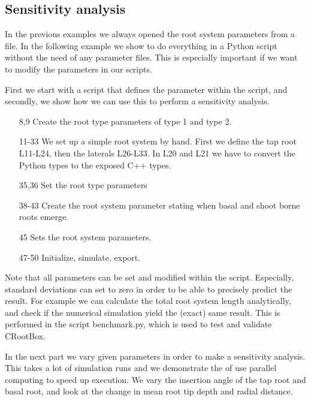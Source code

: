 \documentclass[a4paper]{article}
\begin{document}
\subsection{Sensitivity analysis} \label{sec:sa}

In the previous examples we always opened the root system parameters from a file. 
In the following example we show to do everything in a Python script without the need of any parameter files. 
This is especially important if we want to modify the parameters in our scripts. 

First we start with a script that defines the parameter within the script, and secondly, we show how we can use this to perform a sensitivity analysis.



\begin{itemize}

\item[8,9] Create the root type parameters of type 1 and type 2.
\item[11-33] We set up a simple root system by hand. First we define the tap root L11-L24, then the laterals L26-L33. In L20 and L21 we have to convert the Python types to the exposed C++ types.
\item[35,36] Set the root type parameters

\item[38-43] Create the root system parameter stating when basal and shoot borne roots emerge.

\item[45] Sets the root system parameters.

\item[47-50] Initialize, simulate, export. 

\end{itemize}

Note that all parameters can be set and modified within the script. Especially, standard deviations can set to zero in order to be able to precisely predict the result. 
For example we can calculate the total root system length analytically, and check if the numerical simulation yield the (exact) same result. 
This is performed in the script benchmark.py, which is used to test and validate CRootBox.

In the next part we vary given parameters in order to make a sensitivity analysis. This takes a lot of simulation runs and we demonstrate the of use parallel computing to speed up execution.
We vary the insertion angle of the tap root and basal root, and look at the change in mean root tip depth and radial distance. 
\end{document}
